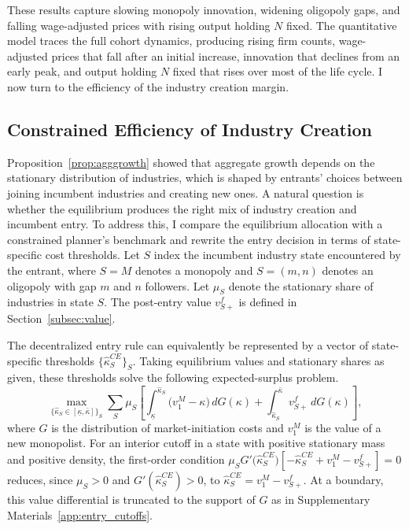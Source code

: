 \documentclass[12pt]{article}
\begin{document}
These results capture slowing monopoly innovation, widening oligopoly gaps, and falling wage-adjusted prices with rising output holding \(N\) fixed. The quantitative model traces the full cohort dynamics, producing rising firm counts, wage-adjusted prices that fall after an initial increase, innovation that declines from an early peak, and output holding \(N\) fixed that rises over most of the life cycle. I now turn to the efficiency of the industry creation margin.

\subsection{Constrained Efficiency of Industry Creation}\label{subsec:planner}

Proposition~\ref{prop:agggrowth} showed that aggregate growth depends on the stationary distribution of industries, which is shaped by entrants' choices between joining incumbent industries and creating new ones. A natural question is whether the equilibrium produces the right mix of industry creation and incumbent entry. To address this, I compare the equilibrium allocation with a constrained planner's benchmark and rewrite the entry decision in terms of state-specific cost thresholds. Let \(S\) index the incumbent industry state encountered by the entrant, where \(S=M\) denotes a monopoly and \(S=(m,n)\) denotes an oligopoly with gap \(m\) and \(n\) followers. Let \(\mu_S\) denote the stationary share of industries in state \(S\). The post-entry value \(v^f_{S+}\) is defined in Section~\ref{subsec:value}.

The decentralized entry rule can equivalently be represented by a vector of state-specific thresholds \(\{\hat{\kappa}^{CE}_S\}_S\). Taking equilibrium values and stationary shares as given, these thresholds solve the following expected-surplus problem.
\begin{equation}
\max_{\{\hat{\kappa}_S\in[\underline{\kappa},\bar{\kappa}]\}_S}
\sum_S \mu_S \left[
  \int_{\underline{\kappa}}^{\hat{\kappa}_S} \bigl(v^M_1 - \kappa\bigr)\, dG(\kappa)
  +
  \int_{\hat{\kappa}_S}^{\bar{\kappa}} v^f_{S+}\, dG(\kappa)
\right],
\label{eq:private_entry_problem}
\end{equation}
where \(G\) is the distribution of market-initiation costs and \(v^M_1\) is the value of a new monopolist. For an interior cutoff in a state with positive stationary mass and positive density, the first-order condition \(\mu_S G'\bigl(\hat\kappa^{CE}_S\bigr)\left[-\hat\kappa^{CE}_S+v^M_1-v^f_{S+}\right]=0\) reduces, since \(\mu_S>0\) and \(G'(\hat\kappa^{CE}_S)>0\), to \(\hat\kappa^{CE}_S=v^M_1-v^f_{S+}\). At a boundary, this value differential is truncated to the support of \(G\) as in Supplementary Materials~\ref{app:entry_cutoffs}.
\end{document}
